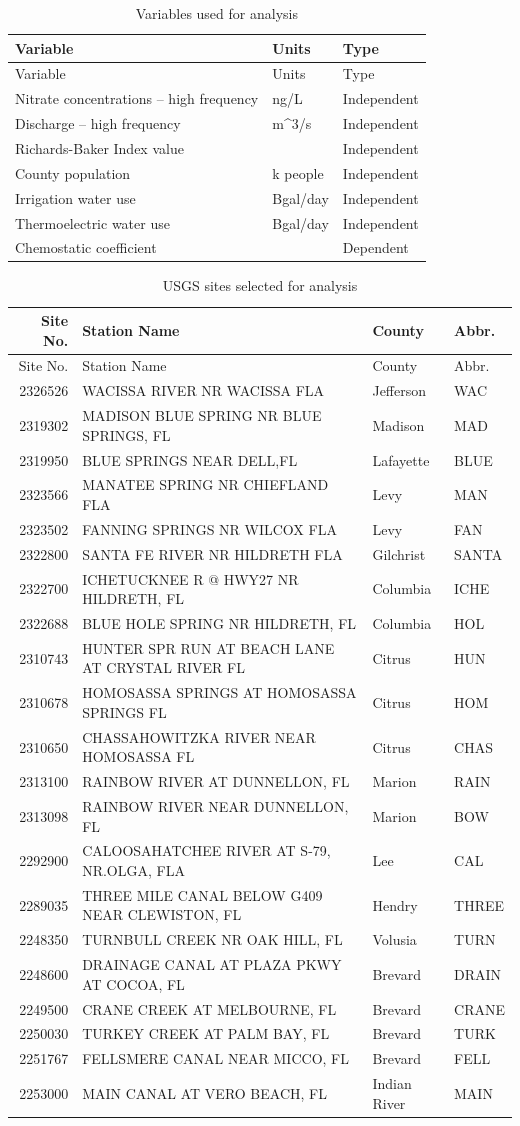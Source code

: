 \documentclass[12pt,]{article}
\begin{document}
\begin{longtable}[]{@{}lll@{}}
\caption{Variables used for analysis}\tabularnewline
\toprule
Variable & Units & Type\tabularnewline
\midrule
\endfirsthead
\toprule
Variable & Units & Type\tabularnewline
\midrule
\endhead
Nitrate concentrations -- high frequency & ng/L &
Independent\tabularnewline
Discharge -- high frequency & m\^{}3/s & Independent\tabularnewline
Richards-Baker Index value & & Independent\tabularnewline
County population & k people & Independent\tabularnewline
Irrigation water use & Bgal/day & Independent\tabularnewline
Thermoelectric water use & Bgal/day & Independent\tabularnewline
Chemostatic coefficient & & Dependent\tabularnewline
\bottomrule
\end{longtable}

\begin{longtable}[]{@{}rlll@{}}
\caption{USGS sites selected for analysis}\tabularnewline
\toprule
Site No. & Station Name & County & Abbr.\tabularnewline
\midrule
\endfirsthead
\toprule
Site No. & Station Name & County & Abbr.\tabularnewline
\midrule
\endhead
2326526 & WACISSA RIVER NR WACISSA FLA & Jefferson & WAC\tabularnewline
2319302 & MADISON BLUE SPRING NR BLUE SPRINGS, FL & Madison &
MAD\tabularnewline
2319950 & BLUE SPRINGS NEAR DELL,FL & Lafayette & BLUE\tabularnewline
2323566 & MANATEE SPRING NR CHIEFLAND FLA & Levy & MAN\tabularnewline
2323502 & FANNING SPRINGS NR WILCOX FLA & Levy & FAN\tabularnewline
2322800 & SANTA FE RIVER NR HILDRETH FLA & Gilchrist &
SANTA\tabularnewline
2322700 & ICHETUCKNEE R @ HWY27 NR HILDRETH, FL & Columbia &
ICHE\tabularnewline
2322688 & BLUE HOLE SPRING NR HILDRETH, FL & Columbia &
HOL\tabularnewline
2310743 & HUNTER SPR RUN AT BEACH LANE AT CRYSTAL RIVER FL & Citrus &
HUN\tabularnewline
2310678 & HOMOSASSA SPRINGS AT HOMOSASSA SPRINGS FL & Citrus &
HOM\tabularnewline
2310650 & CHASSAHOWITZKA RIVER NEAR HOMOSASSA FL & Citrus &
CHAS\tabularnewline
2313100 & RAINBOW RIVER AT DUNNELLON, FL & Marion & RAIN\tabularnewline
2313098 & RAINBOW RIVER NEAR DUNNELLON, FL & Marion & BOW\tabularnewline
2292900 & CALOOSAHATCHEE RIVER AT S-79, NR.OLGA, FLA & Lee &
CAL\tabularnewline
2289035 & THREE MILE CANAL BELOW G409 NEAR CLEWISTON, FL & Hendry &
THREE\tabularnewline
2248350 & TURNBULL CREEK NR OAK HILL, FL & Volusia & TURN\tabularnewline
2248600 & DRAINAGE CANAL AT PLAZA PKWY AT COCOA, FL & Brevard &
DRAIN\tabularnewline
2249500 & CRANE CREEK AT MELBOURNE, FL & Brevard & CRANE\tabularnewline
2250030 & TURKEY CREEK AT PALM BAY, FL & Brevard & TURK\tabularnewline
2251767 & FELLSMERE CANAL NEAR MICCO, FL & Brevard & FELL\tabularnewline
2253000 & MAIN CANAL AT VERO BEACH, FL & Indian River &
MAIN\tabularnewline
\bottomrule
\end{longtable}
\end{document}
